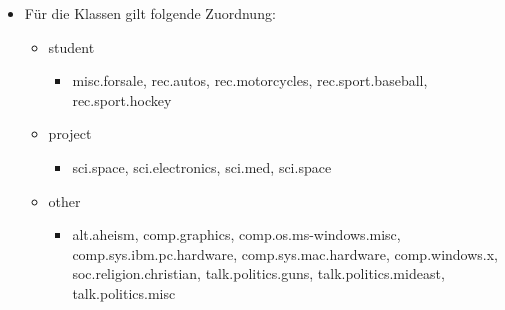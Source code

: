 \begin{frame}[c]
\begin{itemize}
  \item Für die Klassen gilt folgende Zuordnung:
  \begin{itemize}
  \item student
  \begin{itemize}
  \item misc.forsale, rec.autos, 
  rec.motorcycles, rec.sport.baseball, rec.sport.hockey
\end{itemize}
  \item project
  \begin{itemize}
  \item sci.space, sci.electronics, sci.med, sci.space
\end{itemize}
  \item other
  \begin{itemize}
  \item alt.aheism, comp.graphics, comp.os.ms-windows.misc,
  comp.sys.ibm.pc.hardware, comp.sys.mac.hardware, comp.windows.x, soc.religion.christian, talk.politics.guns, talk.politics.mideast, talk.politics.misc
\end{itemize}
\end{itemize}
\end{itemize}
\end{frame}

